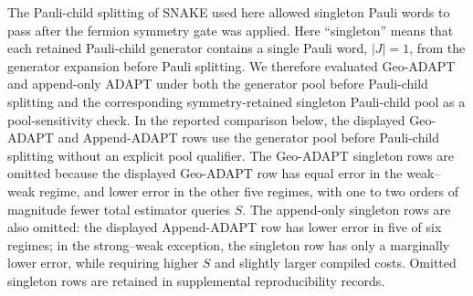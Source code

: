 \documentclass[
  reprint,
  amsmath,
  amssymb,
  aps,
  pra,
  nofootinbib,
  superscriptaddress,
  floatfix
]{revtex4-2}
\begin{document}
The Pauli-child splitting of SNAKE used here allowed singleton Pauli words to pass after the fermion symmetry gate was applied. Here ``singleton'' means that each retained Pauli-child generator contains a single Pauli word, \(|J|=1\), from the generator expansion before Pauli splitting. We therefore evaluated Geo-ADAPT and append-only ADAPT under both the generator pool before Pauli-child splitting and the corresponding symmetry-retained singleton Pauli-child pool as a pool-sensitivity check. In the reported comparison below, the displayed Geo-ADAPT and Append-ADAPT rows use the generator pool before Pauli-child splitting without an explicit pool qualifier. The Geo-ADAPT singleton rows are omitted because the displayed Geo-ADAPT row has equal error in the weak--weak regime, and lower error in the other five regimes, with one to two orders of magnitude fewer total estimator queries \(S\). The append-only singleton rows are also omitted: the displayed Append-ADAPT row has lower error in five of six regimes; in the strong--weak exception, the singleton row has only a marginally lower error, while requiring higher \(S\) and slightly larger compiled costs. Omitted singleton rows are retained in supplemental reproducibility records.
\end{document}
